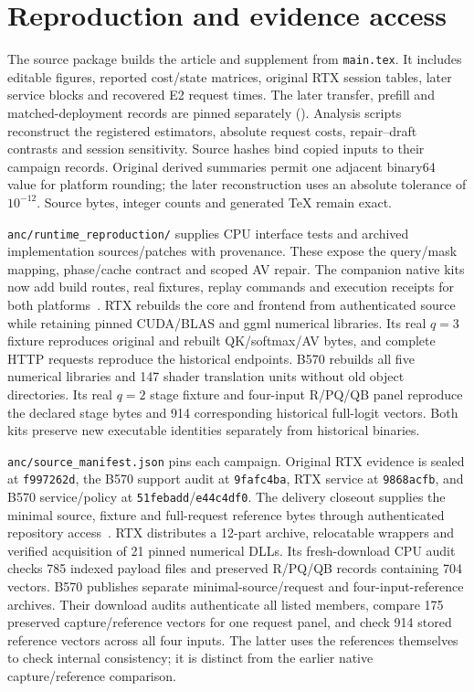 \section{Reproduction and evidence access}
\label{supp:reproduction}
The source package builds the article and supplement from \texttt{main.tex}. It includes editable figures, reported cost/state matrices, original RTX session tables, later service blocks and recovered E2 request times. The later transfer, prefill and matched-deployment records are pinned separately (). Analysis scripts reconstruct the registered estimators, absolute request costs, repair--draft contrasts and session sensitivity. Source hashes bind copied inputs to their campaign records. Original derived summaries permit one adjacent binary64 value for platform rounding; the later reconstruction uses an absolute tolerance of $10^{-12}$. Source bytes, integer counts and generated TeX remain exact.

\texttt{anc/runtime\_reproduction/} supplies CPU interface tests and archived implementation sources/patches with provenance. These expose the query/mask mapping, phase/cache contract and scoped AV repair. The companion native kits now add build routes, real fixtures, replay commands and execution receipts for both platforms~\cite{rtxnativebridge,b570nativereproduction}. RTX rebuilds the core and frontend from authenticated source while retaining pinned CUDA/BLAS and ggml numerical libraries. Its real $q=3$ fixture reproduces original and rebuilt QK/softmax/AV bytes, and complete HTTP requests reproduce the historical endpoints. B570 rebuilds all five numerical libraries and 147 shader translation units without old object directories. Its real $q=2$ stage fixture and four-input R/PQ/QB panel reproduce the declared stage bytes and 914 corresponding historical full-logit vectors. Both kits preserve new executable identities separately from historical binaries.

\texttt{anc/source\_manifest.json} pins each campaign. Original RTX evidence is sealed at \texttt{f997262d}, the B570 support audit at \texttt{9fafc4ba}, RTX service at \texttt{9868acfb}, and B570 service/policy at \texttt{51febadd}/\texttt{e44c4df0}. The delivery closeout supplies the minimal source, fixture and full-request reference bytes through authenticated repository access~\cite{rtxnativedelivery,b570nativedelivery}. RTX distributes a 12-part archive, relocatable wrappers and verified acquisition of 21 pinned numerical DLLs. Its fresh-download CPU audit checks 785 indexed payload files and preserved R/PQ/QB records containing 704 vectors. B570 publishes separate minimal-source/request and four-input-reference archives. Their download audits authenticate all listed members, compare 175 preserved capture/reference vectors for one request panel, and check 914 stored reference vectors across all four inputs. The latter uses the references themselves to check internal consistency; it is distinct from the earlier native capture/reference comparison.

